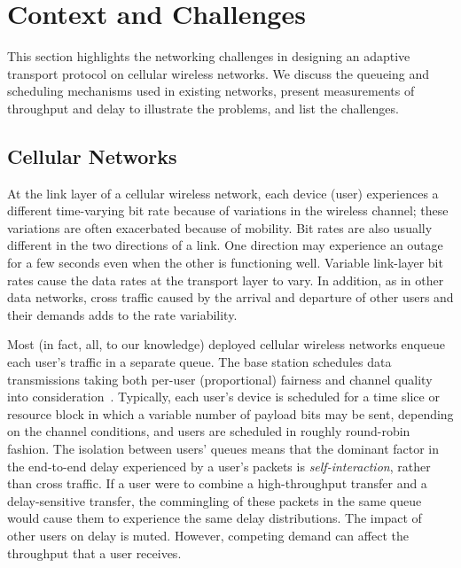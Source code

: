 \section{Context and Challenges}
\label{sprout:problem}

This section highlights the networking challenges in designing an
adaptive transport protocol on cellular wireless networks. We discuss
the queueing and scheduling mechanisms used in existing networks,
present measurements of throughput and delay to illustrate the
problems, and list the challenges.

\subsection{Cellular Networks}

At the link layer of a cellular wireless network, each device (user)
experiences a different time-varying bit rate because of variations in
the wireless channel; these variations are often exacerbated because of
mobility. Bit rates are also usually different in the two directions
of a link. One direction may experience an outage for a few seconds
even when the other is functioning well. Variable link-layer bit rates
cause the data rates at the transport layer to vary. In addition, as
in other data networks, cross traffic caused by the arrival and
departure of other users and their demands adds to the rate
variability.

Most (in fact, all, to our knowledge) deployed cellular wireless
networks enqueue each user's traffic in a separate queue. The base
station schedules data transmissions taking both per-user
(proportional) fairness and channel quality into
consideration~\cite{propfair}. Typically, each user's device is
scheduled for a time slice or resource block in which a variable number of
payload bits may be sent, depending on the channel conditions, and
users are scheduled in roughly round-robin fashion. The isolation
between users' queues means that the dominant factor in the end-to-end
delay experienced by a user's packets is {\em self-interaction},
rather than cross traffic. If a user were to combine a high-throughput
transfer and a delay-sensitive transfer, the commingling of these
packets in the same queue would cause them to experience the same
delay distributions. The impact of other users on delay is
muted. However, competing demand can affect the throughput that a user
receives.

